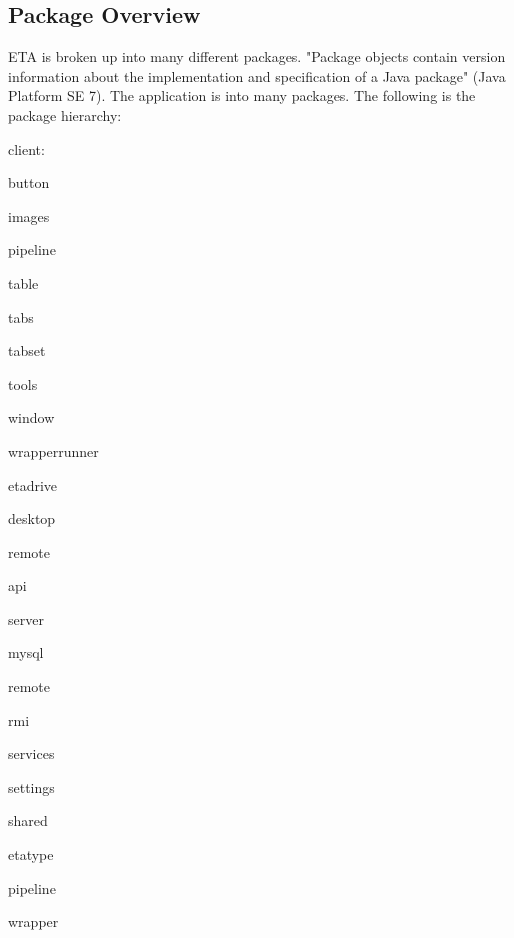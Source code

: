 \documentclass[a4paper,12pt]{article}
\begin{document}
\subsection{Package Overview}
ETA is broken up into many different packages. "Package objects contain version information about the implementation and specification of a Java package" (Java Platform SE 7). The application is into many packages. The following is the package hierarchy:
\begin{compactenum}
    \item client:
    \begin{compactenum}
        \item button
        \item images
        \item pipeline
        \item table
        \item tabs
        \item tabset
        \item tools
        \item window
        \item wrapperrunner
    \end{compactenum}
    \item etadrive
    \begin{compactenum}
        \item desktop
    \end{compactenum}
    \item remote
    \begin{compactenum}
        \item api
    \end{compactenum}
    \item server
    \begin{compactenum}
        \item mysql
        \item remote
        \item rmi
        \item services
        \item settings
    \end{compactenum}
    \item shared
    \begin{compactenum}
        \item etatype
        \item pipeline
        \item wrapper
    \end{compactenum}
\end{compactenum}
\end{document}
